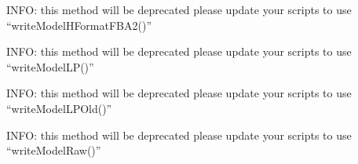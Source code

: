 \documentclass[a4paper,11pt,english]{sphinxmanual}
\begin{document}

\begin{fulllineitems}
\label{modules_doc:cbmpy.CBWrite.WriteModelHFormatFBA2}
INFO: this method will be deprecated please update your scripts to use ``writeModelHFormatFBA2()''

\end{fulllineitems}


\begin{fulllineitems}
\label{modules_doc:cbmpy.CBWrite.WriteModelLP}
INFO: this method will be deprecated please update your scripts to use ``writeModelLP()''

\end{fulllineitems}


\begin{fulllineitems}
\label{modules_doc:cbmpy.CBWrite.WriteModelLPOld}
INFO: this method will be deprecated please update your scripts to use ``writeModelLPOld()''

\end{fulllineitems}


\begin{fulllineitems}
\label{modules_doc:cbmpy.CBWrite.WriteModelRaw}
INFO: this method will be deprecated please update your scripts to use ``writeModelRaw()''

\end{fulllineitems}
\end{document}
